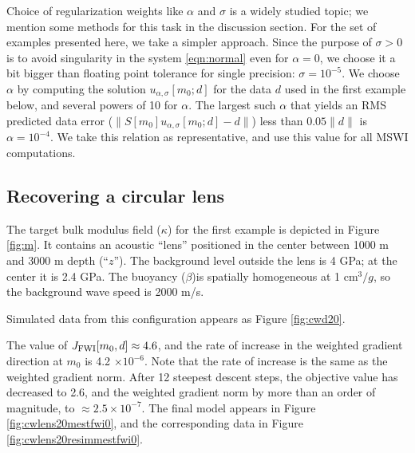Choice of regularization weights like $\alpha$ and $\sigma$ is a
widely studied topic; we mention some methods for this task in the
discussion section. For the set of examples presented here, we take a
simpler approach. Since the purpose of $\sigma>0$ is to avoid singularity
in the system \ref{eqn:normal} even for $\alpha=0$, we choose it a bit
bigger than floating point tolerance for single precision:
$\sigma = 10^{-5}$. We choose $\alpha$ by computing the solution
$u_{\alpha,\sigma}[m_0;d]$ for the data $d$ used in the first example
below, and several powers of 10 for $\alpha$. The largest such
$\alpha$ that yields an RMS predicted data error
($\|S[m_0]u_{\alpha,\sigma}[m_0;d] - d\|$) less than $0.05 \|d\|$ is
$\alpha = 10^{-4}$. We take this relation as representative, and use
this value for all MSWI computations.

\subsection{Recovering a circular lens}

The target bulk modulus field ($\kappa$) for the first example 
is depicted in Figure \ref{fig:m}. It contains an acoustic ``lens''
positioned in the center between 1000 m and 3000 m depth
(``$z$''). The background level outside the lens is 4 GPa; at the
center it is 2.4 GPa. The
buoyancy ($\beta$)is spatially homogeneous at 1 cm$^3/g$, so the background
wave speed is 2000 m/s.


Simulated data from this configuration appears as Figure
\ref{fig:cwd20}.


The value of $J_{\rm FWI}[m_0,d] \approx 4.6$, and the rate of
increase in the weighted gradient direction at $m_0$ is 4.2 $\times
10^{-6 }$. Note that the rate of increase is the same as the weighted
gradient norm. After 12 steepest descent steps, the objective value has
decreased to 2.6, and the
weighted gradient norm by more than an order of magnitude, to $\approx 2.5 \times 10^{-7}$. The
final model appears in Figure \ref{fig:cwlens20mestfwi0}, and the
corresponding data in Figure \ref{fig:cwlens20resimmestfwi0}.


